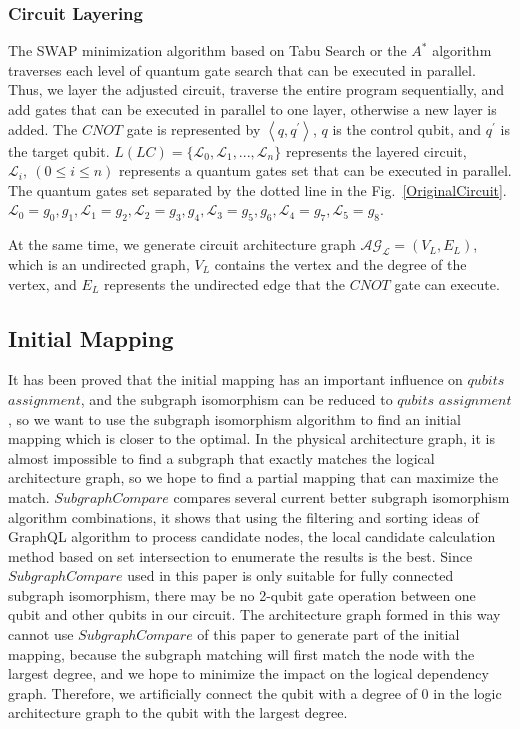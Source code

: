 \documentclass[runningheads]{llncs}
\begin{document}
\subsubsection{Circuit Layering}
The SWAP minimization algorithm based on Tabu Search or the $A^{*}$ algorithm 
traverses each level of quantum gate search that can be executed in parallel.
Thus, we layer the adjusted circuit, 
traverse the entire program sequentially, 
and add gates that can be executed in parallel to one layer, 
otherwise a new layer is added. 
The $CNOT$ gate is represented by $\left \langle q,q^{'}\right \rangle $, $q$ is the control qubit, and $q^{'}$ is the target qubit.
$L(LC)=\{\mathcal{L}_{0},\mathcal{L}_{1},...,\mathcal{L}_{n}\}$ represents the layered circuit, 
$\mathcal{L}_{i}, \ (0 \le i \le n) $ represents a quantum gates set that can be executed in parallel.
The quantum gates set separated by the dotted line in the Fig.~\ref{OriginalCircuit}.
 $\mathcal{L}_{0}={g_{0},g_{1}},\mathcal{L}_{1}={g_{2}},
 \mathcal{L}_{2}={g_{3},g_{4}},\mathcal{L}_{3}={g_{5},g_{6}},\mathcal{L}_{4}={g_{7}},\mathcal{L}_{5}={g_{8}}$.

At the same time, we generate circuit architecture graph $\mathcal{AG_{L}}=(V_{L},E_{L})$,
 which is an undirected graph, $V_{L}$ contains the vertex and the degree of the vertex, 
and $E_{L}$ represents the undirected edge that the $CNOT$ gate can execute.
\subsection{Initial Mapping}
It has been proved that the initial mapping has an important influence on $qubits $  
$ assignment$, 
and the subgraph isomorphism can be reduced to $qubits$ $ assignment$, so we want to use the subgraph 
isomorphism algorithm to find an initial mapping which is closer to the optimal.
In the physical architecture graph, it is almost impossible to find a subgraph that exactly 
matches the logical architecture graph, so we hope to find a partial mapping that can maximize the match. 
$SubgraphCompare$\cite{Sun2020} compares several current better subgraph isomorphism algorithm combinations, 
it shows that using the filtering and sorting ideas of GraphQL algorithm to process 
candidate nodes, the local candidate calculation method based on 
set intersection to enumerate the results is the best.
Since $SubgraphCompare$ used in this paper is only suitable for 
fully connected subgraph isomorphism, 
there may be no 2-qubit gate operation between one qubit and other qubits in our circuit.
 The architecture graph formed in this way cannot use $SubgraphCompare$ 
 of this paper to generate part of the initial mapping, 
 because the subgraph matching will first match the node with the largest degree, 
 and we hope to minimize the impact on the logical dependency graph. 
 Therefore, we artificially connect the qubit with a degree of 0 in the logic architecture graph
to the qubit with the largest degree.
\end{document}
